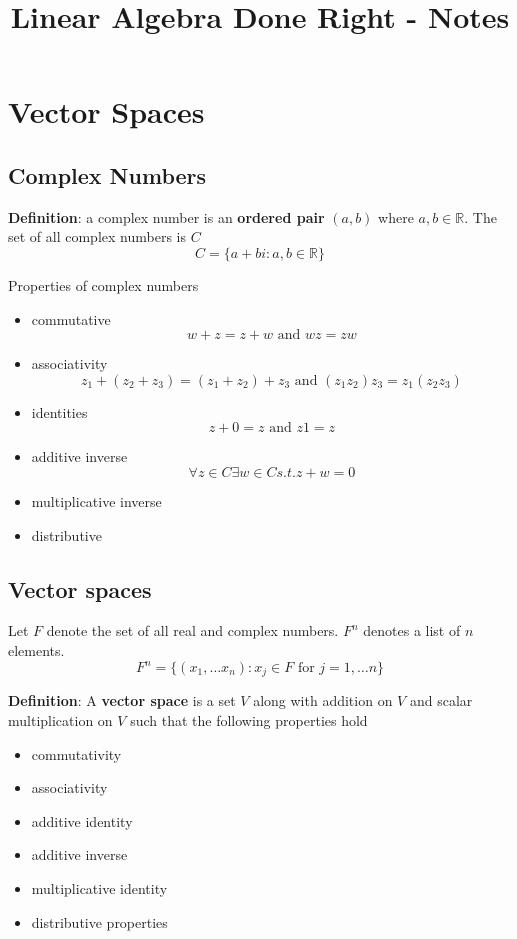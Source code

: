 \documentclass[a4paper, 10pt]{report}
\begin{document}
\title{Linear Algebra Done Right - Notes}
\maketitle
\tableofcontents

\chapter{Vector Spaces}

\section{Complex Numbers}

\begin{framed}
   \textbf{Definition}: a complex number is an \textbf{ordered pair} $(a, b)$ where $a, b \in \mathbb{R}$. The set of all complex numbers is $C$ 
   \[
     C = \{ a + bi: a, b \in \mathbb{R} \} 
   \] 
\end{framed}

Properties of complex numbers
\begin{itemize}
   \item commutative
      \[
        w + z = z + w \text{ and } wz = zw
      \] 
   \item associativity
      \[
         z_1 + (z_2 + z_3) = (z_1 + z_2) + z_3 \text{ and } (z_1z_2) z_3  = z_1 (z_2 z_3)
      \] 
   \item identities
      \[
        z + 0 = z \text{ and } z 1 = z
      \] 
   \item additive inverse
      \[
        \forall z \in C \exists w \in C s.t. z + w = 0
      \]  
   \item multiplicative inverse
   \item distributive
\end{itemize}

  
\section{Vector spaces}

Let $F$ denote the set of all real and complex numbers. $F^n$ denotes a list of $n$ elements. 
\[
   F^n = \{ (x_1, \hdots x_n): x_j \in F \text{ for } j = 1, \hdots n\} 
\] 

\begin{framed}
   \textbf{Definition}: A \textbf{vector space} is a set $V$ along with addition on $V$ and scalar multiplication on $V$ such that the following properties hold
   \begin{itemize}
      \item commutativity
      \item associativity
      \item additive identity
      \item additive inverse
      \item multiplicative identity
      \item distributive properties
   \end{itemize}
\end{framed}
\end{document}
